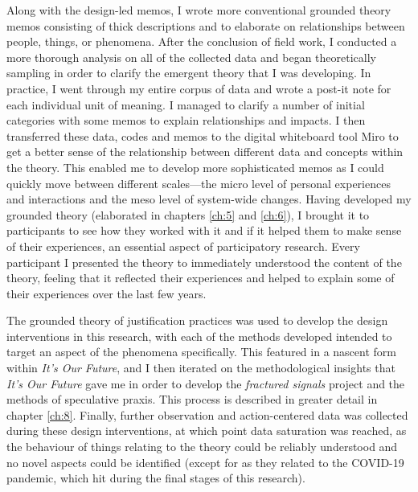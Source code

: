 Along with the design-led memos, I wrote more conventional grounded theory memos consisting of thick descriptions and to elaborate on relationships between people, things, or phenomena. After the conclusion of field work, I conducted a more thorough analysis on all of the collected data and began theoretically sampling in order to clarify the emergent theory that I was developing. In practice, I went through my entire corpus of data and wrote a post-it note for each individual unit of meaning. I managed to clarify a number of initial categories with some memos to explain relationships and impacts. I then transferred these data, codes and memos to the digital whiteboard tool Miro to get a better sense of the relationship between different data and concepts within the theory. This enabled me to develop more sophisticated memos as I could quickly move between different scales—the micro level of personal experiences and interactions and the meso level of system-wide changes. Having developed my grounded theory (elaborated in chapters \ref{ch:5} and \ref{ch:6}), I brought it to participants to see how they worked with it and if it helped them to make sense of their experiences, an essential aspect of participatory research. Every participant I presented the theory to immediately understood the content of the theory, feeling that it reflected their experiences and helped to explain some of their experiences over the last few years.

The grounded theory of justification practices was used to develop the design interventions in this research, with each of the methods developed intended to target an aspect of the phenomena specifically. This featured in a nascent form within \emph{It's Our Future}, and I then iterated on the methodological insights that \emph{It's Our Future} gave me in order to develop the \emph{fractured signals} project and the methods of speculative praxis. This process is described in greater detail in chapter \ref{ch:8}. Finally, further observation and action-centered data was collected during these design interventions, at which point data saturation was reached, as the behaviour of things relating to the theory could be reliably understood and no novel aspects could be identified (except for as they related to the COVID-19 pandemic, which hit during the final stages of this research). 




